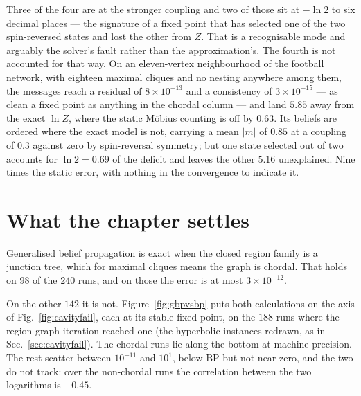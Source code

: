 Three of the four are at the stronger coupling and two of those sit at
$-\ln 2$ to six decimal places --- the signature of a fixed point that has
selected one of the two spin-reversed states and lost the other from $Z$. That
is a recognisable mode and arguably the solver's fault rather than the
approximation's. The fourth is not accounted for that way. On an eleven-vertex
neighbourhood of the football network, with eighteen maximal cliques and no
nesting anywhere among them, the messages reach a residual of
$8\times10^{-13}$ and a consistency of $3\times10^{-15}$ --- as clean a fixed
point as anything in the chordal column --- and land $5.85$ away from the exact
$\ln Z$, where the static M\"obius counting is off by $0.63$. Its beliefs are
ordered where the exact model is not, carrying a mean $|m|$ of $0.85$ at a
coupling of $0.3$ against zero by spin-reversal symmetry; but one state selected
out of two accounts for $\ln 2=0.69$ of the deficit and leaves the other $5.16$
unexplained. Nine times the static error, with nothing in the convergence to
indicate it.

\section{What the chapter settles}
\label{sec:gbpverdict}

Generalised belief propagation is exact when the closed region family is a
junction tree, which for maximal cliques means the graph is chordal. That holds
on $98$ of the $240$ runs, and on those the error is at most
$3\times10^{-12}$.

On the other $142$ it is not. Figure~\ref{fig:gbpvsbp} puts both calculations on
the axis of Fig.~\ref{fig:cavityfail}, each at its stable fixed point, on
the $188$ runs where the region-graph iteration reached one (the hyperbolic
instances redrawn, as in Sec.~\ref{sec:cavityfail}). The chordal runs lie
along the bottom at machine precision. The rest scatter between $10^{-11}$
and $10^{1}$, below $\mathrm{BP}$ but not near zero, and the two do not
track: over the non-chordal runs the correlation between the two logarithms
is $-0.45$.

